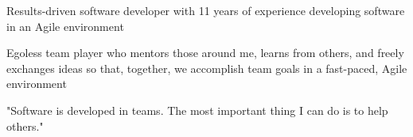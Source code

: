 %
    \begin{itemize*}
        \item Results-driven software developer with 11 years of experience developing software in an Agile environment
        \item Egoless team player who mentors those around me, learns from others, and freely exchanges ideas so that,
            together, we accomplish team goals in a fast-paced, Agile environment
        \item "Software is developed in teams.  The most important thing I can do is to help others."
    \end{itemize*}
